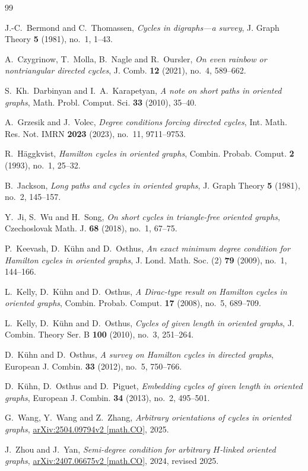 \documentclass[11pt]{amsart}
\theoremstyle{definition}
\begin{document}
\begin{thebibliography}{99}
\footnotesize

J.-C.~Bermond and C.~Thomassen,
\emph{Cycles in digraphs---a survey},
J. Graph Theory \textbf{5} (1981), no.~1, 1--43.

A.~Czygrinow, T.~Molla, B.~Nagle and R.~Oursler,
\emph{On even rainbow or nontriangular directed cycles},
J. Comb. \textbf{12} (2021), no.~4, 589--662.

S.~Kh.~Darbinyan and I.~A.~Karapetyan,
\emph{A note on short paths in oriented graphs},
Math. Probl. Comput. Sci. \textbf{33} (2010), 35--40.

A.~Grzesik and J.~Volec,
\emph{Degree conditions forcing directed cycles},
Int. Math. Res. Not. IMRN \textbf{2023} (2023), no.~11, 9711--9753.

R.~H\"aggkvist,
\emph{Hamilton cycles in oriented graphs},
Combin. Probab. Comput. \textbf{2} (1993), no.~1, 25--32.

B.~Jackson,
\emph{Long paths and cycles in oriented graphs},
J. Graph Theory \textbf{5} (1981), no.~2, 145--157.

Y.~Ji, S.~Wu and H.~Song,
\emph{On short cycles in triangle-free oriented graphs},
Czechoslovak Math. J. \textbf{68} (2018), no.~1, 67--75.

P.~Keevash, D.~K\"uhn and D.~Osthus,
\emph{An exact minimum degree condition for Hamilton cycles in oriented graphs},
J. Lond. Math. Soc. (2) \textbf{79} (2009), no.~1, 144--166.

L.~Kelly, D.~K\"uhn and D.~Osthus,
\emph{A Dirac-type result on Hamilton cycles in oriented graphs},
Combin. Probab. Comput. \textbf{17} (2008), no.~5, 689--709.

L.~Kelly, D.~K\"uhn and D.~Osthus,
\emph{Cycles of given length in oriented graphs},
J. Combin. Theory Ser. B \textbf{100} (2010), no.~3, 251--264.

D.~K\"uhn and D.~Osthus,
\emph{A survey on Hamilton cycles in directed graphs},
European J. Combin. \textbf{33} (2012), no.~5, 750--766.

D.~K\"uhn, D.~Osthus and D.~Piguet,
\emph{Embedding cycles of given length in oriented graphs},
European J. Combin. \textbf{34} (2013), no.~2, 495--501.

G.~Wang, Y.~Wang and Z.~Zhang,
\emph{Arbitrary orientations of cycles in oriented graphs},
\href{https://arxiv.org/abs/2504.09794}{arXiv:2504.09794v2 [math.CO]}, 2025.

J.~Zhou and J.~Yan,
\emph{Semi-degree condition for arbitrary $H$-linked oriented graphs},
\href{https://arxiv.org/abs/2407.06675}{arXiv:2407.06675v2 [math.CO]},
2024, revised 2025.

\end{thebibliography}
\end{document}
